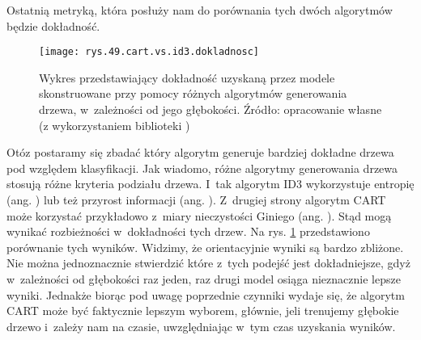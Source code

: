 Ostatnią metryką, która posłuży nam do porównania tych dwóch algorytmów będzie dokładność. 
\begin{figure}[h]
    \centering
    \texttt{[image: rys.49.cart.vs.id3.dokladnosc]}
    \caption{Wykres przedstawiający dokładność uzyskaną przez modele skonstruowane przy pomocy różnych algorytmów generowania drzewa, w~zależności od jego głębokości. Źródło: opracowanie własne (z wykorzystaniem biblioteki )}
    \label{rys.49.cart.vs.id3.dokladnosc}
\end{figure}
Otóz postaramy się zbadać który algorytm generuje bardziej dokładne drzewa pod względem klasyfikacji. 
Jak wiadomo, różne algorytmy generowania drzewa stosują różne kryteria podziału drzewa. I~tak algorytm ID3 wykorzystuje entropię (ang. ) lub też przyrost informacji (ang. ). Z~drugiej strony algorytm CART może korzystać przykładowo z~miary nieczystości Giniego (ang. ). Stąd mogą wynikać rozbieżności w~dokładności tych drzew. Na rys. \ref{rys.49.cart.vs.id3.dokladnosc} przedstawiono porównanie tych wyników. 
Widzimy, że orientacyjnie wyniki są bardzo zbliżone. Nie można jednoznacznie stwierdzić które z~tych podejść jest dokładniejsze, gdyż w~zależności od głębokości raz jeden, raz drugi model osiąga nieznacznie lepsze wyniki. Jednakże biorąc pod uwagę poprzednie czynniki wydaje się, że algorytm CART może być faktycznie lepszym wyborem, głównie, jeli trenujemy głębokie drzewo i~zależy nam na czasie, uwzględniając w~tym czas uzyskania wyników.

